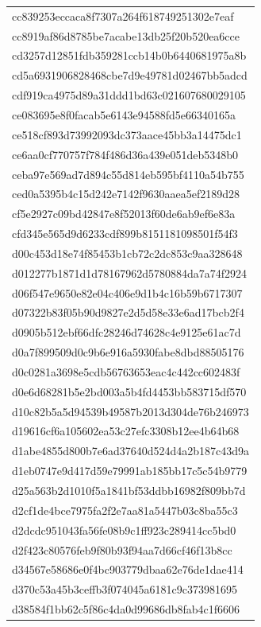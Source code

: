 \begin{tabular}{l}
cc839253eccaca8f7307a264f618749251302e7eaf \\
cc8919af86d8785be7acabe13db25f20b520ea6cce \\
cd3257d12851fdb359281ccb14b0b6440681975a8b \\
cd5a6931906828468cbe7d9e49781d02467bb5adcd \\
cdf919ca4975d89a31ddd1bd63c021607680029105 \\
ce083695e8f0facab5e6143e94588fd5e66340165a \\
ce518cf893d73992093dc373aace45bb3a14475dc1 \\
ce6aa0cf770757f784f486d36a439e051deb5348b0 \\
ceba97e569ad7d894c55d814eb595bf4110a54b755 \\
ced0a5395b4c15d242e7142f9630aaea5ef2189d28 \\
cf5e2927c09bd42847e8f52013f60de6ab9ef6e83a \\
cfd345e565d9d6233cdf899b8151181098501f54f3 \\
d00c453d18e74f85453b1cb72c2dc853c9aa328648 \\
d012277b1871d1d78167962d5780884da7a74f2924 \\
d06f547e9650e82e04c406e9d1b4c16b59b6717307 \\
d07322b83f05b90d9827e2d5d58e33e6ad17bcb2f4 \\
d0905b512ebf66dfc28246d74628c4e9125e61ac7d \\
d0a7f899509d0c9b6e916a5930fabe8dbd88505176 \\
d0c0281a3698e5cdb56763653eac4c442cc602483f \\
d0e6d68281b5e2bd003a5b4fd4453bb583715df570 \\
d10c82b5a5d94539b49587b2013d304de76b246973 \\
d19616cf6a105602ea53c27efc3308b12ee4b64b68 \\
d1abe4855d800b7e6ad37640d524d4a2b187c43d9a \\
d1eb0747e9d417d59e79991ab185bb17c5c54b9779 \\
d25a563b2d1010f5a1841bf53ddbb16982f809bb7d \\
d2cf1de4bce7975fa2f2e7aa81a5447b03c8ba55c3 \\
d2dcdc951043fa56fe08b9c1ff923c289414cc5bd0 \\
d2f423c80576feb9f80b93f94aa7d66cf46f13b8cc \\
d34567e58686e0f4bc903779dbaa62e76de1dae414 \\
d370c53a45b3ceffb3f074045a6181c9c373981695 \\
d38584f1bb62c5f86c4da0d99686db8fab4c1f6606 \\

\end{tabular}
